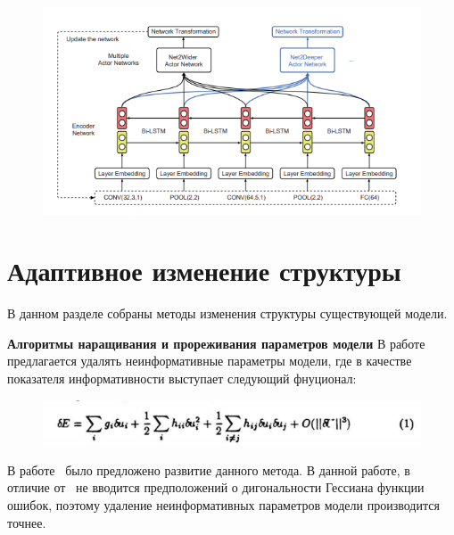 \begin{figure}[H]
\includegraphics[width=\textwidth]{./plots/arch_review_figs/deep2net.png}
\end{figure}



\section{Адаптивное изменение структуры}
В данном разделе собраны методы изменения структуры существующей модели. 

\textbf{Алгоритмы наращивания и прореживания параметров модели}
В работе~\cite{obd} предлагается удалять неинформативные параметры модели, где в качестве показателя информативности выступает следующий фнуционал: 
\begin{figure}[H]
\includegraphics[width=\textwidth]{./plots/arch_review_figs/obd.png}
\end{figure}
В работе~\cite{obs} было предложено развитие данного метода. В данной работе, в отличие от~\cite{obd} не вводится предположений о дигональности Гессиана функции ошибок, поэтому удаление неинформативных параметров модели производится точнее.

